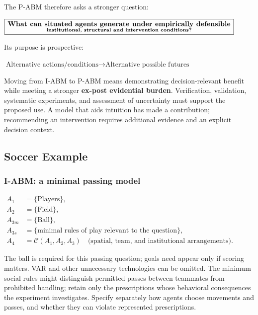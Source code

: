 \documentclass[11pt,a4paper]{article}
\newenvironment{fitdisplay}{\par\medskip\noindent\begin{lrbox}{\displaybox}$\displaystyle}{%
$\end{lrbox}\makebox[\linewidth][c]{\ifdim\wd\displaybox>\linewidth\resizebox{\linewidth}{!}{\usebox{\displaybox}}\else\usebox{\displaybox}\fi}\par\medskip}
\begin{document}
The P-ABM therefore asks a stronger question:

\begin{fitdisplay}
\boxed{
\textbf{What can situated agents generate under empirically defensible}
\atop
\textbf{institutional, structural and intervention conditions?}
}
\end{fitdisplay}

Its purpose is prospective:

\begin{fitdisplay}
\boxed{
\text{Alternative actions/conditions}
\rightarrow
\text{Alternative possible futures}
}
\end{fitdisplay}

Moving from I-ABM to P-ABM means demonstrating decision-relevant benefit while meeting a stronger \textbf{ex-post evidential burden}. Verification, validation, systematic experiments, and assessment of uncertainty must support the proposed use. A model that aids intuition has made a contribution; recommending an intervention requires additional evidence and an explicit decision context.

\subsection{Soccer Example}

\subsubsection{I-ABM: a minimal passing model}
\begin{fitdisplay}
\begin{aligned}
A_1&=\{\text{Players}\},\\
A_2&=\{\text{Field}\},\\
A_{3m}&=\{\text{Ball}\},\\
A_{3s}&=\{\text{minimal rules of play relevant to the question}\},\\
A_4&=\mathcal C(A_1,A_2,A_3)\quad\text{(spatial, team, and institutional arrangements)}.
\end{aligned}
\end{fitdisplay}
The ball is required for this passing question; goals need appear only if scoring matters. VAR and other unnecessary technologies can be omitted. The minimum social rules might distinguish permitted passes between teammates from prohibited handling; retain only the prescriptions whose behavioral consequences the experiment investigates. Specify separately how agents choose movements and passes, and whether they can violate represented prescriptions.
\end{document}
